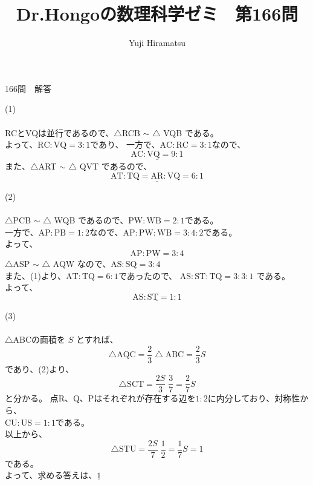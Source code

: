 \documentclass[a4j,10pt,oneside,openany]{jsbook}
\title{{\Huge \textbf{Dr.Hongoの数理科学ゼミ　第166問}}\\}
\author{Yuji Hiramatsu}
\date{}
\newcommand{\btu}{\bigtriangleup} %
\newcommand{\mr}{\mathrm}
\begin{document}
%
%
\maketitle
%
%


{\Huge 166問　解答}

\vspace{3\baselineskip}

{\Large (1)}
\\
\\
RCとVQは並行であるので、$\btu$RCB $\sim$ $\btu$ VQB である。\\
よって、$\mr{RC}:\mr{VQ} = 3:1$であり、
一方で、$\mr{AC}:\mr{RC} = 3:1$なので、\\
\[ \underline{\mr{AC}:\mr{VQ} = 9:1} \]
また、$\btu$ART $\sim$ $\btu$ QVT であるので、\\
\[ \underline{\mr{AT}:\mr{TQ} = \mr{AR}:\mr{VQ} = 6:1} \]

\vspace{1\baselineskip}

{\Large (2)}
\\
\\
$\btu$PCB $\sim$ $\btu$ WQB であるので、$\mr{PW} : \mr{WB} = 2:1$である。\\
一方で、$\mr{AP}:\mr{PB} = 1:2$なので、$\mr{AP}:\mr{PW} : \mr{WB} = 3:4:2$である。\\
よって、
\[ \underline{\mr{AP} : \mr{PW} = 3:4} \]
$\btu$ASP $\sim$ $\btu$ AQW なので、$\mr{AS}:\mr{SQ} = 3:4$ \\
また、(1)より、$ \mr{AT}:\mr{TQ} = 6:1 $であったので、
$ \mr{AS} : \mr{ST} : \mr{TQ} = 3 : 3 : 1 $
である。\\
よって、
\[ \underline{\mr{AS}:\mr{ST} = 1:1} \]

\vspace{1\baselineskip}

{\Large (3)}
\\
\\
$\btu$ABCの面積を $S$ とすれば、\\
\[ {\btu}\mr{AQC} = \frac{2}{3} {\btu}\mr{ABC} = \frac{2}{3}S \]
であり、(2)より、
\[ {\btu}\mr{SCT} = \frac{2S}{3} \; \frac{3}{7} = \frac{2}{7}S \]
と分かる。
点R、Q、Pはそれぞれが存在する辺を$1:2$に内分しており、対称性から、\\
$\mr{CU}:\mr{US} = 1:1$である。\\
以上から、
\[ {\btu}\mr{STU} = \frac{2S}{7} \; \frac{1}{2} = \frac{1}{7}S = 1 \]
である。\\
よって、求める答えは、$\underline{1}$

\newpage
%
%
\end{document}
